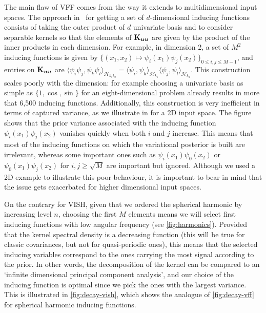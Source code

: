 The main flaw of VFF comes from the way it extends to multidimensional input spaces. The approach in~\citet{hensman2017variational} for getting a set of $d$-dimensional inducing functions consists of taking the outer product of $d$ univariate basis and to consider separable kernels so that the elements of $\mathbf{{K}}_{\bm{u} \bm{u}}$ are given by the product of the inner products in each dimension. For example, in dimension 2, a set of $M^2$ inducing functions is given by $\{(x_1, x_2) \mapsto \psi_i(x_1)\psi_j(x_2)\}_{0 \leq i, j \leq M-1}$, and entries on $\mathbf{{K}}_{\bm{u} \bm{u}}$ are $\langle \psi_i\psi_j, \psi_k\psi_l \rangle_{\mathcal{H}_{k_1 k_2}^{}}^{} = \langle \psi_i, \psi_k \rangle_{\mathcal{H}_{k_1}^{}}^{} \langle \psi_j, \psi_l \rangle_{\mathcal{H}_{k_2}^{}}^{}$. This construction scales poorly with the dimension: for example choosing a univariate basis as simple as $\{1, \cos, \sin\}$ for an eight-dimensional problem already results in more that 6,500 inducing functions. Additionally, this construction is very inefficient in terms of captured variance, as we illustrate in   for a 2D input space. The figure shows that the prior variance associated with the inducing function $\psi_i(x_1)\psi_j(x_2)$ vanishes quickly when both $i$ and $j$ increase. This means that most of the inducing functions on which the variational posterior is built are irrelevant, whereas some important ones such as $\psi_i(x_1)\psi_0(x_2)$ or $\psi_0(x_1)\psi_j(x_2)$ for $i, j \geq \sqrt{M}$ are important but ignored. Although we used a 2D example to illustrate this poor behaviour, it is important to bear in mind that the issue gets exacerbated for higher dimensional input spaces.

On the contrary for VISH, given that we ordered the spherical harmonic by increasing level $n$, choosing the first $M$ elements means we will select first inducing functions with low angular frequency (see \cref{fig:harmonics}). Provided that the kernel spectral density is a decreasing function (this will be true for classic covariances, but not for quasi-periodic ones), this means that the selected inducing variables correspond to the ones carrying the most signal according to the prior. In other words, the decomposition of the kernel can be compared to an `infinite dimensional principal component analysis', and our choice of the inducing function is optimal since we pick the ones with the largest variance. This is illustrated in \cref{fig:decay-vish}, which shows the analogue of \cref{fig:decay-vff} for spherical harmonic inducing functions.


